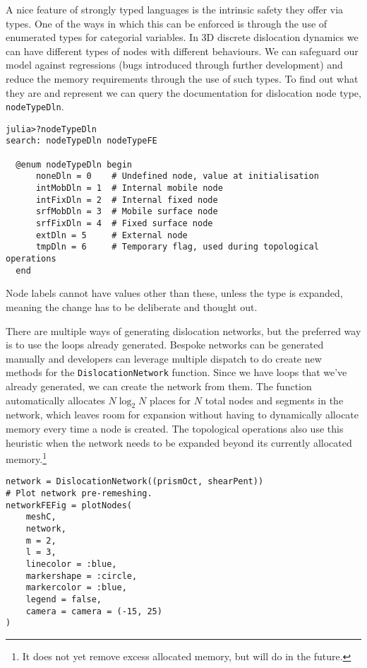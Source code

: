 A nice feature of strongly typed languages is the intrinsic safety they offer via types. One of the ways in which this can be enforced is through the use of enumerated types for categorial variables. In 3D discrete dislocation dynamics we can have different types of nodes with different behaviours. We can safeguard our model against regressions (bugs introduced through further development) and reduce the memory requirements through the use of such types. To find out what they are and represent we can query the documentation for dislocation node type, \texttt{nodeTypeDln}.
\begin{verbatim}
julia>?nodeTypeDln
search: nodeTypeDln nodeTypeFE

  @enum nodeTypeDln begin
      noneDln = 0    # Undefined node, value at initialisation
      intMobDln = 1  # Internal mobile node
      intFixDln = 2  # Internal fixed node
      srfMobDln = 3  # Mobile surface node
      srfFixDln = 4  # Fixed surface node
      extDln = 5     # External node
      tmpDln = 6     # Temporary flag, used during topological operations
  end 
\end{verbatim}
Node labels cannot have values other than these, unless the type is expanded, meaning the change has to be deliberate and thought out.

There are multiple ways of generating dislocation networks, but the preferred way is to use the loops already generated. Bespoke networks can be generated manually and developers can leverage multiple dispatch to do create new methods for the \texttt{DislocationNetwork} function. Since we have loops that we've already generated, we can create the network from them. The function automatically allocates $N\log_2N$ places for $N$ total nodes and segments in the network, which leaves room for expansion without having to dynamically allocate memory every time a node is created. The topological operations also use this heuristic when the network needs to be expanded beyond its currently allocated memory.\footnote{It does not yet remove excess allocated memory, but will do in the future.}
\begin{verbatim}
network = DislocationNetwork((prismOct, shearPent))
# Plot network pre-remeshing.
networkFEFig = plotNodes(
    meshC,
    network,
    m = 2,
    l = 3,
    linecolor = :blue,
    markershape = :circle,
    markercolor = :blue,
    legend = false,
    camera = camera = (-15, 25)
)
\end{verbatim}

